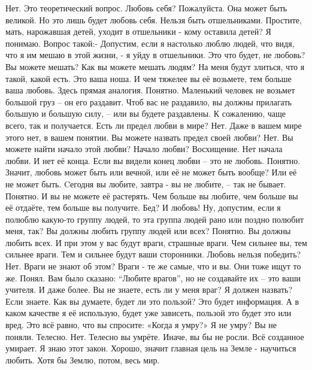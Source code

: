 \documentclass{extbook}
\newcommand{\soul}[1]{{#1}}
\newcommand{\people}[1]{{#1}}
\begin{document}
\people{Нет. Это теоретический вопрос.}
\soul{Любовь себя? Пожалуйста. Она может быть великой. Но это лишь будет любовь себя. Нельзя быть отшельниками. Простите, мать, нарожавшая детей, уходит в отшельники - кому оставила детей?}
\people{Я понимаю. Вопрос такой:- Допустим, если я настолько люблю людей, что видя, что я им мешаю в этой жизни, - я уйду в отшельники. Это что будет, не любовь?}
\soul{Вы можете мешать? Как вы можете мешать людям?}
\people{На меня будут злиться, что я такой, какой  есть.}
\soul{Это ваша ноша. И чем тяжелее вы её возьмете, тем больше ваша любовь. Здесь прямая аналогия.}
\people{Понятно.}
\soul{Маленький человек не возьмет большой груз – он его раздавит. Чтоб вас не раздавило, вы должны прилагать большую и большую силу, – или вы будете раздавлены. К  сожалению, чаще всего, так и получается.}
\people{Есть ли предел любви в мире?}
\soul{Нет. Даже в вашем мире этого нет, в вашем понятии. Вы можете назвать предел своей любви? }
\people{Нет.}
\soul{Вы можете найти начало этой любви?}
\people{Начало любви? Восхищение.}
\soul{Нет начала любви. И нет её  конца. Если вы видели конец любви – это не любовь.}
\people{Понятно. Значит, любовь может быть или вечной, или её не может быть вообще?}
\soul{Или её не может быть.  Cегодня  вы любите, завтра -  вы не любите, – так не бывает.}
\people{Понятно.}
\soul{И вы не можете её растерять. Чем больше вы любите, чем больше вы её отдаёте, тем больше вы получите.}
\people{Бед?}
\soul{И любовь!}
\people{Ну, допустим, если я полюблю какую-то группу людей, то эта группа людей рано или поздно полюбит меня, так?}
\soul{Вы должны любить группу людей или всех?}
\people{Понятно.}
\soul{Вы должны любить всех. И при этом у вас будут враги, страшные враги. Чем сильнее вы, тем сильнее враги. Тем и сильнее будут ваши сторонники.}
\people{Любовь нельзя победить?}
\soul{Нет.}
\people{Враги не знают об этом?}
\soul{Враги  - те же самые, что и вы. Они тоже ищут то же.}
\people{Понял.}
\soul{Вам было сказано: ``Любите врагов'', но не создавайте их – это ваши учителя. И даже более.}
\people{Вы не знаете, есть ли у меня враг?}
\soul{Я должен назвать?}
\people{Если знаете.}
\soul{Как вы думаете, будет ли это пользой?}
\people{Это будет информация. А в каком качестве я её использую, будет уже зависеть, пользой это будет это или вред.}
\soul{Это всё равно, что вы спросите: «Когда я умру?»}
\people{Я не умру?}
\soul{Вы не поняли.}
\people{Телесно.}
\soul{Нет. Телесно вы умрёте. Иначе, вы бы не росли. Всё созданное умирает.}
\people{Я знаю этот закон. Хорошо, значит главная цель на Земле -  научиться любить. Хотя бы Землю, потом, весь мир.}
\end{document}
